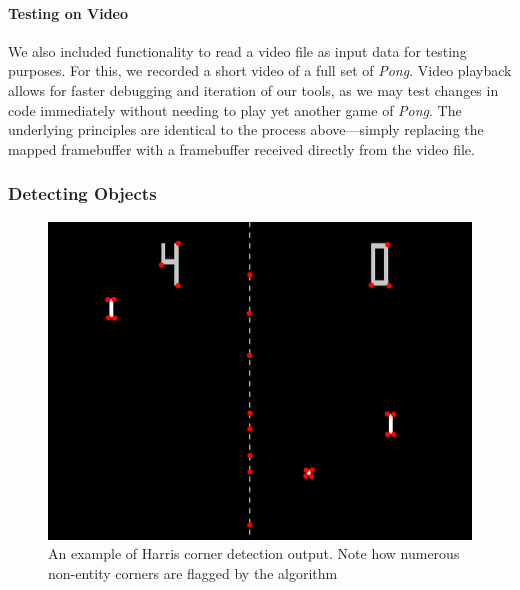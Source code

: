 \documentclass{report}
\begin{document}
\paragraph{Testing on Video} 
We also included functionality to read a video file as input data for testing purposes. For this, we recorded a short video of a full set of \emph{Pong}. Video playback allows for faster debugging and iteration of our tools, as we may test changes in code immediately without needing to play yet another game of \emph{Pong}. The underlying principles are identical to the process above---simply replacing the mapped framebuffer with a framebuffer received directly from the video file.

\subsubsection{Detecting Objects}

\begin{figure}
    \includegraphics[width=\textwidth]{pongCorners.jpg}
    \caption{An example of Harris corner detection output. Note how numerous non-entity corners are flagged by the algorithm}
    \label{fig:pongCorners}
\end{figure}
\end{document}
